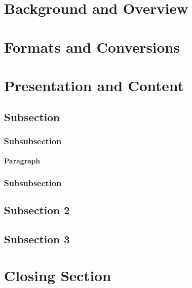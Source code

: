 \lipsum[6]

\section{Background and Overview}\label{sec:formats-intro}

\section{Formats and Conversions}\label{sec:fomats}

\section{Presentation and Content}\label{sec:pres-and-content}

\subsection{Subsection}

\subsubsection{Subsubsection}

\paragraph{Paragraph}

\subsubsection{Subsubsection}

\subsection{Subsection 2}

\subsection{Subsection 3}

\section{Closing Section}\label{sec:closing}
